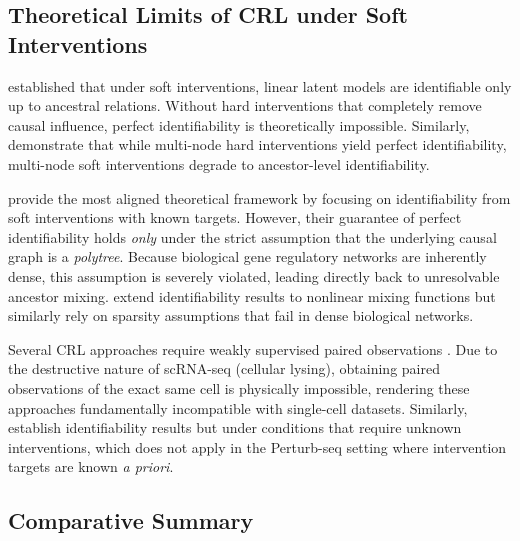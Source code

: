 
\subsection{Theoretical Limits of CRL under Soft Interventions}
\label{app:crl_methods:theory}

\citet{squires2023linear} established that under soft interventions, linear latent models are identifiable only up to ancestral relations. Without hard interventions that completely remove causal influence, perfect identifiability is theoretically impossible. Similarly, \citet{varici2024multi} demonstrate that while multi-node hard interventions yield perfect identifiability, multi-node soft interventions degrade to ancestor-level identifiability.

\citet{zhang2023identifiability} provide the most aligned theoretical framework by focusing on identifiability from soft interventions with known targets. However, their guarantee of perfect identifiability holds \textit{only} under the strict assumption that the underlying causal graph is a \emph{polytree}. Because biological gene regulatory networks are inherently dense, this assumption is severely violated, leading directly back to unresolvable ancestor mixing. \citet{buchholz2023learning} extend identifiability results to nonlinear mixing functions but similarly rely on sparsity assumptions that fail in dense biological networks.

Several CRL approaches require weakly supervised paired observations \citep{brehmer2022weakly}. Due to the destructive nature of scRNA-seq (cellular lysing), obtaining paired observations of the exact same cell is physically impossible, rendering these approaches fundamentally incompatible with single-cell datasets. Similarly, \citet{von2023nonparametric} establish identifiability results but under conditions that require unknown interventions, which does not apply in the Perturb-seq setting where intervention targets are known \emph{a priori}.


\subsection{Comparative Summary}
\label{app:crl_methods:summary}


